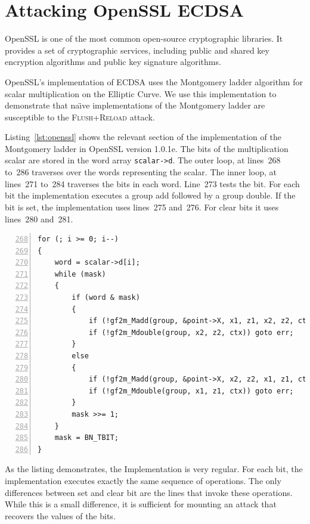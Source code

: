 \documentclass{llncs}
\begin{document}

\section{Attacking OpenSSL ECDSA}\label{sec:attack}
OpenSSL is one of the most common open-source cryptographic libraries.
It provides a set of cryptographic services, including public and shared key encryption 
algorithms and public key signature algorithms.

OpenSSL's implementation of ECDSA uses the Montgomery ladder algorithm for scalar multiplication
on the Elliptic Curve.
We use this implementation to demonstrate that na{\"\i}ve implementations of the Montgomery ladder are
susceptible to the \textsc{Flush+Reload} attack.

Listing~\ref{lst:openssl} shows the relevant section of the implementation of the Montgomery ladder in OpenSSL version 1.0.1e.
The bits of the multiplication scalar are stored in the word array \texttt{scalar->d}.
The outer loop, at lines~268 to~286 traverses over the words representing the scalar.
The inner loop, at lines~271 to~284 traverses the bits in each word.
Line~273 tests the bit. 
For each bit the implementation executes a group add followed by a group double.
If the bit is set, the implementation uses lines~275 and~276.
For clear bits it uses lines~280 and~281.

\begin{lstlisting}[numbers=left,firstnumber=268,float=htb,caption=OpenSSL Implementation of the Montgomery Ladder,label=lst:openssl]
for (; i >= 0; i--)
{
    word = scalar->d[i];
    while (mask)
    {
        if (word & mask)
        {
            if (!gf2m_Madd(group, &point->X, x1, z1, x2, z2, ctx)) goto err;
            if (!gf2m_Mdouble(group, x2, z2, ctx)) goto err;
        }
        else
        {
            if (!gf2m_Madd(group, &point->X, x2, z2, x1, z1, ctx)) goto err;
            if (!gf2m_Mdouble(group, x1, z1, ctx)) goto err;
        }
        mask >>= 1;
    }
    mask = BN_TBIT;
}
\end{lstlisting}

As the listing demonstrates, the Implementation is very regular.
For each bit, the implementation executes exactly the same sequence of operations.
The only differences between set and clear bit are the lines that invoke these operations.
While this is a small difference, it is sufficient for mounting an attack that recovers 
the values of the bits.
\end{document}

